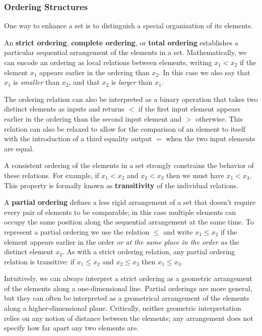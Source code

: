 \documentclass[
  letterpaper,
  DIV=11,
  numbers=noendperiod]{scrartcl}
\begin{document}
\subsubsection{Ordering Structures}\label{ordering-structures}

One way to enhance a set is to distinguish a special organization of its
elements.

An \textbf{strict ordering}, \textbf{complete ordering}, or
\textbf{total ordering} establishes a particular sequential arrangement
of the elements in a set. Mathematically, we can encode an ordering as
local relations between elements, writing \(x_{1} < x_{2}\) if the
element \(x_{1}\) appears earlier in the ordering than \(x_{2}\). In
this case we also say that \(x_{1}\) is \emph{smaller} than \(x_{2}\),
and that \(x_{2}\) is \emph{larger} than \(x_{1}\).

The ordering relation can also be interpreted as a binary operation that
takes two distinct elements as inputs and returns \(<\) if the first
input element appears earlier in the ordering than the second input
element and \(>\) otherwise. This relation can also be relaxed to allow
for the comparison of an element to itself with the introduction of a
third equality output \(=\) when the two input elements are equal.

A consistent ordering of the elements in a set strongly constrains the
behavior of these relations. For example, if \(x_{1} < x_{2}\) and
\(x_{2} < x_{3}\) then we must have \(x_{1} < x_{3}\). This property is
formally known as \textbf{transitivity} of the individual relations.

A \textbf{partial ordering} defines a less rigid arrangement of a set
that doesn't require every pair of elements to be comparable; in this
case multiple elements can occupy the same position along the sequential
arrangement at the same time. To represent a partial ordering we use the
relation \(\le\) and write \(x_{1} \le x_{2}\) if the element appears
earlier in the order \emph{or at the same place in the order as} the
distinct element \(x_{2}\). As with a strict ordering relation, any
partial ordering relation is transitive: if \(x_{1} \le x_{2}\) and
\(x_{2} \le x_{3}\) then \(x_{1} \le x_{3}\).

Intuitively, we can always interpret a strict ordering as a geometric
arrangement of the elements along a one-dimensional line. Partial
orderings are more general, but they can often be interpreted as a
geometrical arrangement of the elements along a higher-dimensional
plane. Critically, neither geometric interpretation relies on any notion
of distance between the elements; any arrangement does not specify how
far apart any two elements are.
\end{document}
